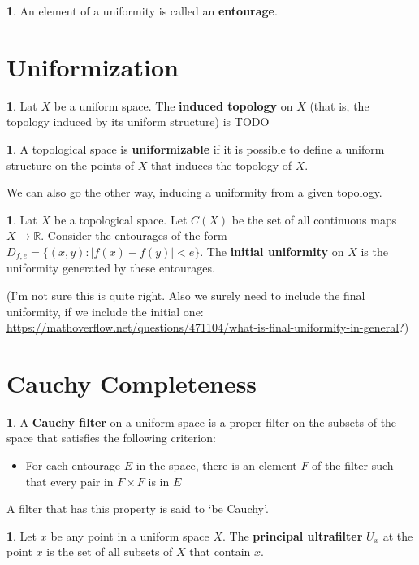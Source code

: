\documentclass[oneside,english]{amsbook}
\numberwithin{section}{chapter}
\theoremstyle{plain}
\theoremstyle{definition}
\newtheorem{defn}[thm]{\protect\definitionname}
\providecommand{\definitionname}{Definition}
\begin{document}
\begin{defn}
	An element of a uniformity is called an \textbf{entourage}.
\end{defn}

\section{Uniformization}

\begin{defn}
	Lat $X$ be a uniform space. The \textbf{induced topology} on $X$ (that is, the topology induced by its uniform structure) is TODO
\end{defn}

\begin{defn}
	A topological space is \textbf{uniformizable} if it is possible to define a uniform structure on the points of $X$ that induces the topology of $X$.
\end{defn}

We can also go the other way, inducing a uniformity from a given topology.

\begin{defn}
	Lat $X$ be a topological space. Let $C(X)$ be the set of all continuous maps $X\to\mathbb{R}$. Consider the entourages of the form $D_{f, e}=\{(x, y) : |f(x) - f(y)| < e \}$. The \textbf{initial uniformity} on $X$ is the uniformity generated by these entourages.
\end{defn}
 (I'm not sure this is quite right. Also we surely need to include the final uniformity, if we include the initial one: \url{https://mathoverflow.net/questions/471104/what-is-final-uniformity-in-general}?)

\section{Cauchy Completeness}

\begin{defn}
	A \textbf{Cauchy filter} on a uniform space is a proper filter on the subsets of the space that satisfies the following criterion:
	\begin{itemize}
		\item For each entourage $E$ in the space, there is an element $F$ of the filter such that every pair in $F\times F$ is in $E$
	\end{itemize}
	A filter that has this property is said to `be Cauchy'.
\end{defn}

\begin{defn}
	Let $x$ be any point in a uniform space $X$. The \textbf{principal ultrafilter} $U_x$ at the point $x$ is the set of all subsets of $X$ that contain $x$.
\end{defn}
\end{document}
